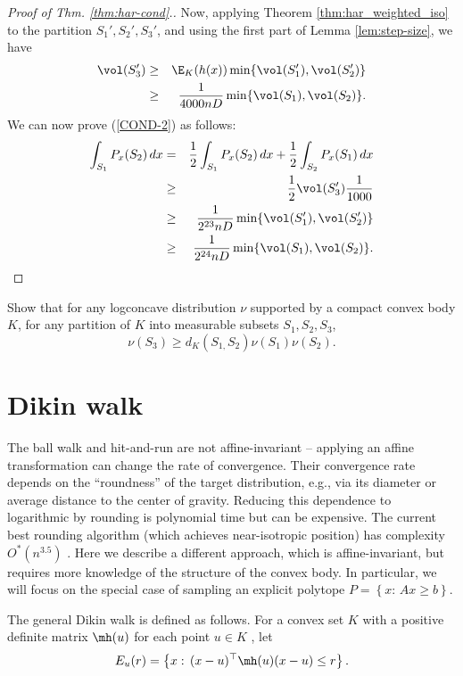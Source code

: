 \begin{proof}[Proof of Thm. \ref{thm:har-cond}.]
Now, applying Theorem \ref{thm:har_weighted_iso} to the partition
$S_{1}',S_{2}',S_{3}'$, and using the first part of Lemma \ref{lem:step-size},
we have 
\begin{eqnarray*}
\vol(S_{3}') & \geq & \E_{K}(h(x))\min\{\vol(S_{1}'),\vol(S_{2}')\}\\
 & \geq & \frac{1}{4000nD}\min\{\vol(S_{1}),\vol(S_{2})\}.
\end{eqnarray*}
We can now prove (\ref{COND-2}) as follows: 
\begin{eqnarray*}
\int_{S_{1}}P_{x}(S_{2})\,dx & = & \frac{1}{2}\int_{S_{1}}P_{x}(S_{2})\,dx+\frac{1}{2}\int_{S_{2}}P_{x}(S_{1})\,dx\\
 & \ge & \frac{1}{2}\vol(S_{3}')\frac{1}{1000}\\
 & \ge & \frac{1}{2^{23}nD}\min\{\vol(S_{1}'),\vol(S_{2}')\}\\
 & \ge & \frac{1}{2^{24}nD}\min\{\vol(S_{1}),\vol(S_{2})\}.
\end{eqnarray*}
\end{proof}
\begin{xca}
Show that for any logconcave distribution $\nu$ supported by a compact
convex body $K$, for any partition of $K$ into measurable subsets
$S_{1},S_{2},S_{3}$, 
\[
\nu(S_{3})\ge d_{K}(S_{1,}S_{2})\nu(S_{1})\nu(S_{2}).
\]
\end{xca}


\section{Dikin walk}

The ball walk and hit-and-run are not affine-invariant -- applying
an affine transformation can change the rate of convergence. Their
convergence rate depends on the ``roundness'' of the target distribution,
e.g., via its diameter or average distance to the center of gravity.
Reducing this dependence to logarithmic by rounding is polynomial
time but can be expensive. The current best rounding algorithm (which
achieves near-isotropic position) has complexity $O^{*}(n^{3.5})$
\cite{JLLV26}. Here we describe a different approach, which is affine-invariant,
but requires more knowledge of the structure of the convex body. In
particular, we will focus on the special case of sampling an explicit
polytope $P=\left\{ x:\,Ax\ge b\right\} $.

The general Dikin walk is defined as follows. For a convex set $K$
with a positive definite matrix $\mh(u)$ for each point $u\in K$
, let
\[
E_{u}(r)=\left\{ x:\,(x-u)^{\top}\mh(u)(x-u)\le r\right\} .
\]

